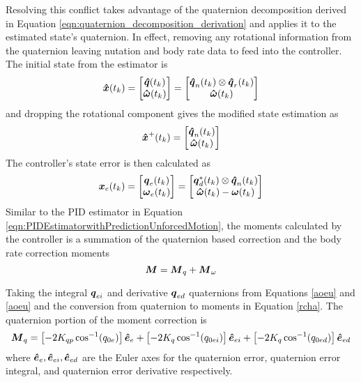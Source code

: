 Resolving this conflict takes advantage of the quaternion decomposition derived in Equation \ref{eqn:quaternion_decomposition_derivation} and applies it to the estimated state's quaternion.  In effect, removing any rotational information from the quaternion leaving nutation and body rate data to feed into the controller.  The initial state from the estimator is
\begin{equation}
  \boldsymbol{\hat{x}}(t_{k}) = \begin{bmatrix} \boldsymbol{\hat{q}}(t_{k}) \\ \boldsymbol{\hat{\omega}}(t_{k}) \end{bmatrix} = \begin{bmatrix} \boldsymbol{\hat{q}}_n(t_{k}) \otimes \boldsymbol{\hat{q}}_r(t_{k}) \\ \boldsymbol{\hat{\omega}}(t_{k}) \end{bmatrix}
\end{equation}
and dropping the rotational component gives the modified state estimation as
\begin{equation}
  \boldsymbol{\hat{x}}^+(t_{k}) = \begin{bmatrix} \boldsymbol{\hat{q}}_n(t_{k})  \\ \boldsymbol{\hat{\omega}}(t_{k}) \end{bmatrix}
\end{equation}
The controller's state error is then calculated as
\begin{equation}
  \boldsymbol{x}_e(t_{k}) = \begin{bmatrix} \boldsymbol{q}_e(t_{k}) \\ \boldsymbol{\omega}_e(t_{k}) \end{bmatrix} = \begin{bmatrix} \boldsymbol{q}_d^*(t_{k}) \otimes \boldsymbol{\hat{q}}_n(t_{k}) \\ \boldsymbol{\hat{\omega}}(t_{k}) - \boldsymbol{\omega}(t_{k}) \end{bmatrix}
\end{equation}
Similar to the PID estimator in Equation \ref{eqn:PIDEstimatorwithPredictionUnforcedMotion}, the moments calculated by the controller is a summation of the quaternion based correction and the body rate correction moments
\begin{equation}
  \boldsymbol{M} = \boldsymbol{M}_q + \boldsymbol{M}_{\omega}
\end{equation}

Taking the integral $\boldsymbol{q}_{ei}$ and derivative $\boldsymbol{q}_{ed}$ quaternions from Equations \ref{aoeu} and \ref{aoeu} and the conversion from quaternion to moments in Equation \ref{rcha}.  The quaternion portion of the moment correction is
\begin{equation}
  \boldsymbol{M}_{q} = \left[-2 K_{qp} \cos^{-1} (q_{0e}) \right] \boldsymbol{\hat{e}}_e + \left[-2 K_{q} \cos^{-1} (q_{0ei}) \right] \boldsymbol{\hat{e}}_{ei} + \left[-2 K_{q} \cos^{-1} (q_{0ed}) \right] \boldsymbol{\hat{e}}_{ed}
\end{equation}
where $\boldsymbol{\hat{e}}_e, \boldsymbol{\hat{e}}_{ei}, \boldsymbol{\hat{e}}_{ed}$ are the Euler axes for the quaternion error, quaternion error integral, and quaternion error derivative respectively.

